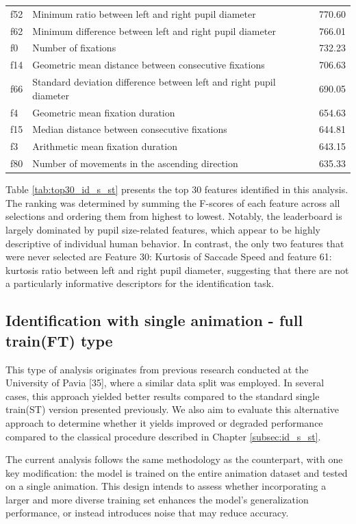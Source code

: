 \documentclass{article}
\begin{document}
\begin{table}[htbp]
\begin{tabular}{lll}
f52 & Minimum ratio between left and right pupil diameter & 770.60 \\
f62 & Minimum difference between left and right pupil diameter & 766.01 \\
f0 & Number of fixations & 732.23 \\
f14 & Geometric mean distance between consecutive fixations & 706.63 \\
f66 & Standard deviation difference between left and right pupil diameter & 690.05 \\
f4 & Geometric mean fixation duration & 654.63 \\
f15 & Median distance between consecutive fixations & 644.81 \\
f3 & Arithmetic mean fixation duration & 643.15 \\
f80 & Number of movements in the ascending direction & 635.33 \\
\bottomrule
\end{tabular}
\end{table}

Table \ref{tab:top30_id_s_st} presents the top 30 features identified in this analysis.
The ranking was determined by summing the F-scores of each feature across all selections and ordering them from highest to lowest.
Notably, the leaderboard is largely dominated by pupil size-related features, which appear to be highly descriptive of individual human behavior.
In contrast, the only two features that were never selected are Feature 30: Kurtosis of Saccade Speed and feature 61: kurtosis ratio between left and right pupil diameter, suggesting that there are not a particularly informative descriptors for the identification task.

\subsection{Identification with single animation - full train(FT) type}
\label{subsec:id_s_ft}

This type of analysis originates from previous research conducted at the University of Pavia [35], where a similar data split was employed. 
In several cases, this approach yielded better results compared to the standard single train(ST) version presented previously.
We also aim to evaluate this alternative approach to determine whether it yields improved or degraded performance compared to the classical procedure described in Chapter \ref{subsec:id_s_st}. 

The current analysis follows the same methodology as the counterpart, with one key modification: the model is trained on the entire animation dataset and tested on a single animation. 
This design intends to assess whether incorporating a larger and more diverse training set enhances the model's generalization performance, or instead introduces noise that may reduce accuracy.
\end{document}
